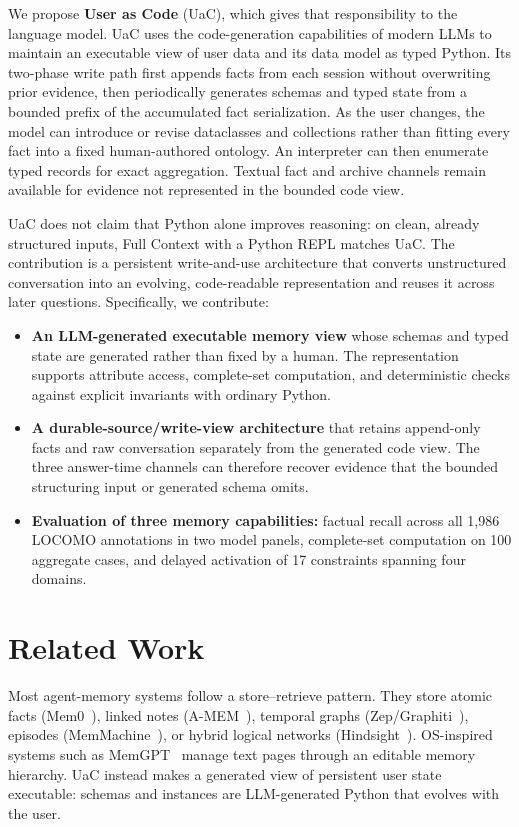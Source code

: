 We propose \textbf{User as Code} (UaC), which gives that responsibility to the language model. UaC uses the code-generation capabilities of modern LLMs to maintain an executable view of user data and its data model as typed Python. Its two-phase write path first appends facts from each session without overwriting prior evidence, then periodically generates schemas and typed state from a bounded prefix of the accumulated fact serialization. As the user changes, the model can introduce or revise dataclasses and collections rather than fitting every fact into a fixed human-authored ontology. An interpreter can then enumerate typed records for exact aggregation. Textual fact and archive channels remain available for evidence not represented in the bounded code view.

UaC does not claim that Python alone improves reasoning: on clean, already structured inputs, Full Context with a Python REPL matches UaC. The contribution is a persistent write-and-use architecture that converts unstructured conversation into an evolving, code-readable representation and reuses it across later questions. Specifically, we contribute:
\begin{itemize}[leftmargin=*]
\item \textbf{An LLM-generated executable memory view} whose schemas and typed state are generated rather than fixed by a human. The representation supports attribute access, complete-set computation, and deterministic checks against explicit invariants with ordinary Python.
\item \textbf{A durable-source/write-view architecture} that retains append-only facts and raw conversation separately from the generated code view. The three answer-time channels can therefore recover evidence that the bounded structuring input or generated schema omits.
\item \textbf{Evaluation of three memory capabilities:} factual recall across all 1{,}986 LOCOMO annotations in two model panels, complete-set computation on 100 aggregate cases, and delayed activation of 17 constraints spanning four domains.
\end{itemize}

\section{Related Work}
\label{sec:related}

Most agent-memory systems follow a store--retrieve pattern. They store atomic facts (Mem0~\citep{chhikara2025mem0}), linked notes (A-MEM~\citep{xu2025amem}), temporal graphs (Zep/Graphiti~\citep{rasmussen2025zep}), episodes (MemMachine~\citep{wang2026memmachine}), or hybrid logical networks (Hindsight~\citep{latimer2025hindsight}). OS-inspired systems such as MemGPT~\citep{packer2023memgpt} manage text pages through an editable memory hierarchy. UaC instead makes a generated view of persistent user state executable: schemas and instances are LLM-generated Python that evolves with the user.

